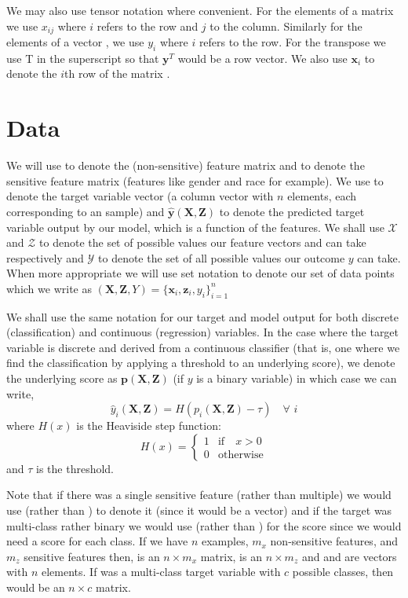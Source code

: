 We may also use tensor notation where convenient. For the elements of a matrix  we use $x_{ij}$ where $i$ refers to the row and $j$ to the column. Similarly for the elements of a vector , we use $y_i$ where $i$ refers to the row. For the transpose we use T in the superscript so that $\boldsymbol{y}^T$ would be a row vector. We also use $\boldsymbol{x}_i$ to denote the $i$th row of the matrix .

\section*{Data}

We will use  to denote the (non-sensitive) feature matrix and  to denote the sensitive feature matrix (features like gender and race for example). We use  to denote the target variable vector (a column vector with $n$ elements, each corresponding to an sample) and $\boldsymbol{\hat{y}}(\boldsymbol{X},\boldsymbol{Z})$ to denote the predicted target variable output by our model, which is a function of the features. We shall use $\mathcal{X}$ and $\mathcal{Z}$ to denote the set of possible values our feature vectors  and  can take respectively and $\mathcal{Y}$ to denote the set of all possible values our outcome $y$ can take. When more appropriate we will use set notation to denote our set of data points which we write as $(\boldsymbol{X}, \boldsymbol{Z}, Y)=\{\boldsymbol{x}_i, \boldsymbol{z}_i, y_i\}_{i=1}^n$

We shall use the same notation for our target and model output for both discrete (classification) and continuous (regression) variables. In the case where the target variable is discrete and derived from a continuous classifier (that is, one where we find the classification by applying a threshold to an underlying score), we denote the underlying score as $\boldsymbol{p}(\boldsymbol{X},\boldsymbol{Z})$ (if $y$ is a binary variable) in which case we can write,
\[
\hat{y}_i(\boldsymbol{X},\boldsymbol{Z})
= H\left( p_i(\boldsymbol{X},\boldsymbol{Z}) - \tau \right) \quad
  \forall \,\, i
\]
where $H(x)$ is the Heaviside step function:
\[
H(x) = \left\{
\begin{array}{rl}
1 & \textrm{if} \quad x > 0 \\
0 & \textrm{otherwise}
\end{array}
\right.
\]
and $\tau$ is the threshold.

Note that if there was a single sensitive feature (rather than multiple) we would use  (rather than ) to denote it (since it would be a vector) and if the target was multi-class rather binary we would use  (rather than ) for the score since we would need a score for each class. If we have $n$ examples, $m_x$ non-sensitive features, and $m_z$ sensitive features then,  is an $n \times m_x$ matrix,  is an $n \times m_z$ and  and  are vectors with $n$ elements. If  was a multi-class target variable with $c$ possible classes, then  would be an $n \times c$ matrix. 


